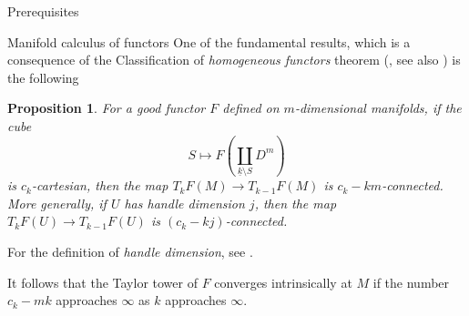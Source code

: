 \documentclass[12pt]{amsart}
\theoremstyle{plain}
\newtheorem{prop}[thm]{Proposition}
\theoremstyle{definition}
\theoremstyle{remark}
\begin{document}
\begin{section}{Prerequisites}
\begin{subsection}{Manifold calculus of functors}
One of the fundamental results, which is a consequence of the Classification of \textit{homogeneous functors} theorem (\cite[Theorem 8.5]{W:EI1}, see also \cite[Theorem 10.2.23 and Proposition 10.2.26]{MV:Cubes}) is the following
\begin{prop}\label{P:ConnOfLayer}
For a good functor $F$ defined on $m$-dimensional manifolds, if 
the cube $$S\mapsto F\left(\coprod_{\underline{k} \setminus S}D^m\right)$$ is $c_k$-cartesian, then the map $T_kF(M)\to T_{k-1}F(M)$ is $c_k-km$-connected. 
More generally, if $U$ has handle dimension $j$, then the map $T_kF(U)\to T_{k-1}F(U)$ is $(c_k-kj)$-connected.
\end{prop}
For the definition of \textit{handle dimension}, see \cite[Appendix A.2.1]{MV:Cubes}. 

It follows that the Taylor tower of $F$ converges intrinsically at $M$ if the number $c_k-mk$ approaches $\infty$ as $k$ approaches $\infty$.


\end{subsection}
\end{section}
\end{document}

